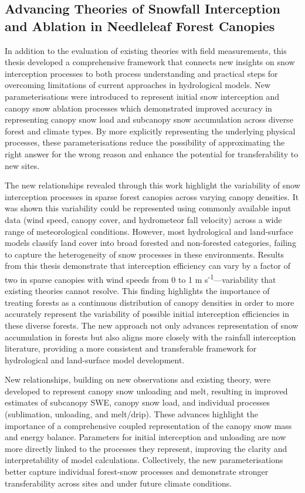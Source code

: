 \documentclass[
  letterpaper,
]{tex/uofsthesis-cs}
\begin{document}
\subsection{Advancing Theories of Snowfall Interception and Ablation in
Needleleaf Forest
Canopies}\label{advancing-theories-of-snowfall-interception-and-ablation-in-needleleaf-forest-canopies}

In addition to the evaluation of existing theories with field
measurements, this thesis developed a comprehensive framework that
connects new insights on snow interception processes to both process
understanding and practical steps for overcoming limitations of current
approaches in hydrological models. New parameterisations were introduced
to represent initial snow interception and canopy snow ablation
processes which demonstrated improved accuracy in representing canopy
snow load and subcanopy snow accumulation across diverse forest and
climate types. By more explicitly representing the underlying physical
processes, these parameterisations reduce the possibility of
approximating the right answer for the wrong reason and enhance the
potential for transferability to new sites.

The new relationships revealed through this work highlight the
variability of snow interception processes in sparse forest canopies
across varying canopy densities. It was shown this variability could be
represented using commonly available input data (wind speed, canopy
cover, and hydrometeor fall velocity) across a wide range of
meteorological conditions. However, most hydrological and land-surface
models classify land cover into broad forested and non-forested
categories, failing to capture the heterogeneity of snow processes in
these environments. Results from this thesis demonstrate that
interception efficiency can vary by a factor of two in sparse canopies
with wind speeds from 0 to 1 m s\textsuperscript{-1}---variability that
existing theories cannot resolve. This finding highlights the importance
of treating forests as a continuous distribution of canopy densities in
order to more accurately represent the variability of possible initial
interception efficiencies in these diverse forests. The new approach not
only advances representation of snow accumulation in forests but also
aligns more closely with the rainfall interception literature, providing
a more consistent and transferable framework for hydrological and
land-surface model development.

New relationships, building on new observations and existing theory,
were developed to represent canopy snow unloading and melt, resulting in
improved estimates of subcanopy SWE, canopy snow load, and individual
processes (sublimation, unloading, and melt/drip). These advances
highlight the importance of a comprehensive coupled representation of
the canopy snow mass and energy balance. Parameters for initial
interception and unloading are now more directly linked to the processes
they represent, improving the clarity and interpretability of model
calculations. Collectively, the new parameterisations better capture
individual forest-snow processes and demonstrate stronger
transferability across sites and under future climate conditions.
\end{document}
